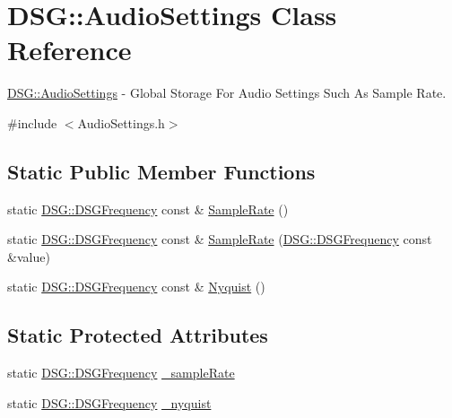 \hypertarget{class_d_s_g_1_1_audio_settings}{\section{D\+S\+G\+:\+:Audio\+Settings Class Reference}
\label{class_d_s_g_1_1_audio_settings}
}


\hyperlink{class_d_s_g_1_1_audio_settings}{D\+S\+G\+::\+Audio\+Settings} -\/ Global Storage For Audio Settings Such As Sample Rate.  




{\ttfamily \#include $<$Audio\+Settings.\+h$>$}

\subsection*{Static Public Member Functions}
\begin{DoxyCompactItemize}
\item 
static \hyperlink{namespace_d_s_g_a4315a061386fa1014fda09b15d3a6973}{D\+S\+G\+::\+D\+S\+G\+Frequency} const \& \hyperlink{class_d_s_g_1_1_audio_settings_a4f459c389b10c11828e2f2f00c012c49}{Sample\+Rate} ()
\item 
static \hyperlink{namespace_d_s_g_a4315a061386fa1014fda09b15d3a6973}{D\+S\+G\+::\+D\+S\+G\+Frequency} const \& \hyperlink{class_d_s_g_1_1_audio_settings_a9c5640e47b6eaa4331a0e5053abb1314}{Sample\+Rate} (\hyperlink{namespace_d_s_g_a4315a061386fa1014fda09b15d3a6973}{D\+S\+G\+::\+D\+S\+G\+Frequency} const \&value)
\item 
static \hyperlink{namespace_d_s_g_a4315a061386fa1014fda09b15d3a6973}{D\+S\+G\+::\+D\+S\+G\+Frequency} const \& \hyperlink{class_d_s_g_1_1_audio_settings_a8cb4afd7b58e927300ff46fbeb71bec7}{Nyquist} ()
\end{DoxyCompactItemize}
\subsection*{Static Protected Attributes}
\begin{DoxyCompactItemize}
\item 
static \hyperlink{namespace_d_s_g_a4315a061386fa1014fda09b15d3a6973}{D\+S\+G\+::\+D\+S\+G\+Frequency} \hyperlink{class_d_s_g_1_1_audio_settings_a56869b51933f102b197f54001c8a1d27}{\+\_\+sample\+Rate}
\item 
static \hyperlink{namespace_d_s_g_a4315a061386fa1014fda09b15d3a6973}{D\+S\+G\+::\+D\+S\+G\+Frequency} \hyperlink{class_d_s_g_1_1_audio_settings_af3c7cbd15390d9bcbe39983c069390b5}{\+\_\+nyquist}
\end{DoxyCompactItemize}


